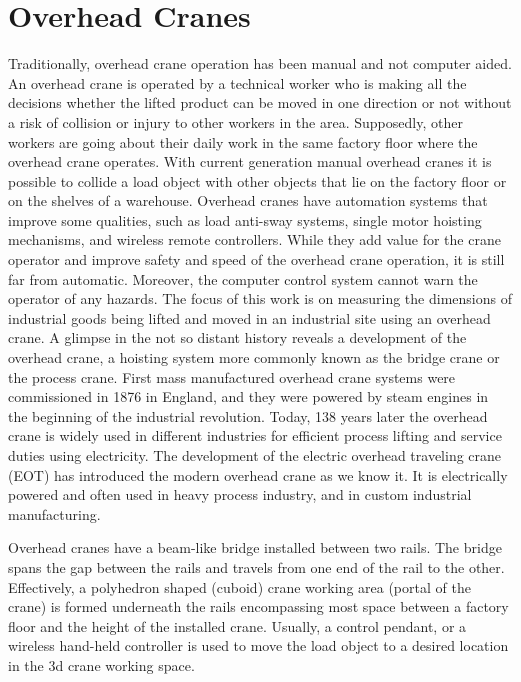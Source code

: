 \documentclass[12pt,a4paper,oneside,pdftex]{report}
\begin{document}
\section{Overhead Cranes}
\label{section:overhead_cranes}
Traditionally, overhead crane operation has been manual and not computer aided. An overhead crane is operated by a technical worker who is making all the decisions whether the lifted product can be moved in one direction or not without a risk of collision or injury to other workers in the area. Supposedly, other workers are going about their daily work in the same factory floor where the overhead crane operates. With current generation manual overhead cranes it is possible to collide a load object with other objects that lie on the factory floor or on the shelves of a warehouse. Overhead cranes have automation systems that improve some qualities, such as load anti-sway systems, single motor hoisting mechanisms, and wireless remote controllers. While they add value for the crane operator and improve safety and speed of the overhead crane operation, it is still far from automatic. Moreover, the computer control system cannot warn the operator of any hazards.
The focus of this work is on measuring the dimensions of industrial goods being lifted and moved in an industrial site using an overhead crane. A glimpse in the not so distant history reveals a development of the overhead crane, a hoisting system more commonly known as the bridge crane or the process crane. First mass manufactured overhead crane systems were commissioned in 1876 in England, and they were powered by steam engines in the beginning of the industrial revolution. Today, 138 years later the overhead crane is widely used in different industries for efficient process lifting and service duties using electricity. The development of the electric overhead traveling crane (EOT) has introduced the modern overhead crane as we know it. It is electrically powered and often used in heavy process industry, and in custom industrial manufacturing.\par
    Overhead cranes have a beam-like bridge installed between two rails. The bridge spans the gap between the rails and travels from one end of the rail to the other. Effectively, a polyhedron shaped (cuboid) crane working area (portal of the crane) is formed underneath the rails encompassing most space between a factory floor and the height of the installed crane. Usually, a control pendant, or a wireless hand-held controller is used to move the load object to a desired location in the 3d crane working space. \par
\end{document}
